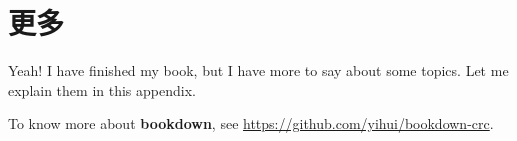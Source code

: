 \documentclass[
]{krantz}
\begin{document}
\cleardoublepage

\hypertarget{appendix-appendix}{%
\appendix {}}


\hypertarget{ux66f4ux591a}{%
\chapter{更多}\label{ux66f4ux591a}}

Yeah! I have finished my book, but I have more to say about some topics. Let me explain them in this appendix.

To know more about \textbf{bookdown}, see \url{https://github.com/yihui/bookdown-crc}.

  

\backmatter
\printindex
\end{document}
